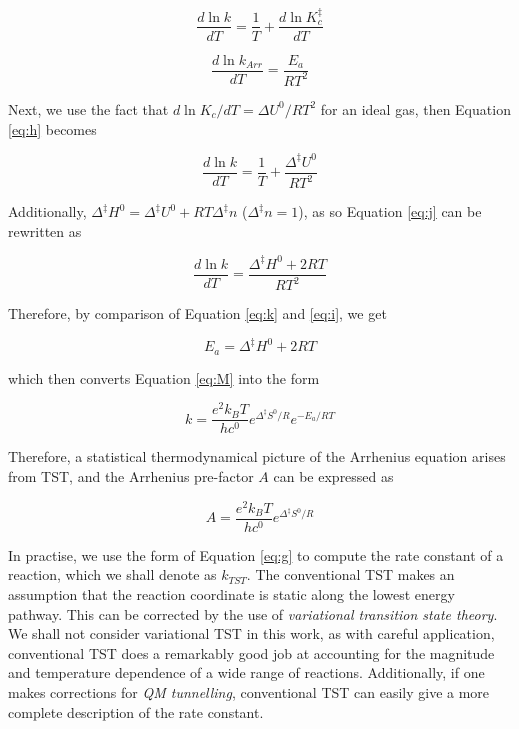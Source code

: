 \begin{equation}
  \frac{d \ln k}{dT} = \frac{1}{T} + \frac{d \ln K_c^\ddagger}{dT}
  \label{eq:h}
\end{equation}

\begin{equation}
  \frac{d \ln k_{Arr}}{dT} = \frac{E_a}{RT^2}
  \label{eq:i}
\end{equation}

\noindent Next, we use the fact that $d \ln K_c / dT = \Delta U^0/RT^2$ for an ideal gas, then Equation \ref{eq:h}  becomes

\begin{equation}
  \frac{d \ln k}{dT} = \frac{1}{T} + \frac{\Delta ^\ddagger U^0}{RT^2}
  \label{eq:j}
\end{equation}

\noindent Additionally, $\Delta ^\ddagger H^0 = \Delta ^\ddagger U^0 + RT \Delta^\ddagger n$ ($\Delta^\ddagger n = 1$), as so Equation \ref{eq:j} can be rewritten as

\begin{equation}
  \frac{d \ln k}{dT} = \frac{\Delta ^\ddagger H^0 + 2RT}{RT^2}
  \label{eq:k}
\end{equation}

\noindent Therefore, by comparison of Equation \ref{eq:k} and \ref{eq:i}, we get

\begin{equation}
  E_a = \Delta^\ddagger H^0 + 2RT
\end{equation}

\noindent which then converts Equation \ref{eq:M} into the form

\begin{equation}
  k = \frac{e^2k_BT}{hc^0}e^{\Delta^\ddagger S^0/R}e^{-E_a/RT}
\end{equation}

Therefore, a statistical thermodynamical picture of the Arrhenius equation arises from TST, and the Arrhenius pre-factor $A$ can be expressed as

\begin{equation}
  A = \frac{e^2k_BT}{hc^0}e^{\Delta^\ddagger S^0/R}
\end{equation}

In practise, we use the form of Equation \ref{eq:g} to compute the rate constant of a reaction, which we shall denote as $k_{TST}$. The conventional TST makes an assumption that the reaction coordinate is static along the lowest energy pathway. This can be corrected by the use of \emph{variational transition state theory}.\cite{Truhlar1984} We shall not consider variational TST in this work, as with careful application, conventional TST does a remarkably good job at accounting for the magnitude and temperature dependence of a wide range of reactions.\cite{Steinfeld1998} Additionally, if one makes corrections for \emph{QM tunnelling}, conventional TST can easily give a more complete description of the rate constant.


